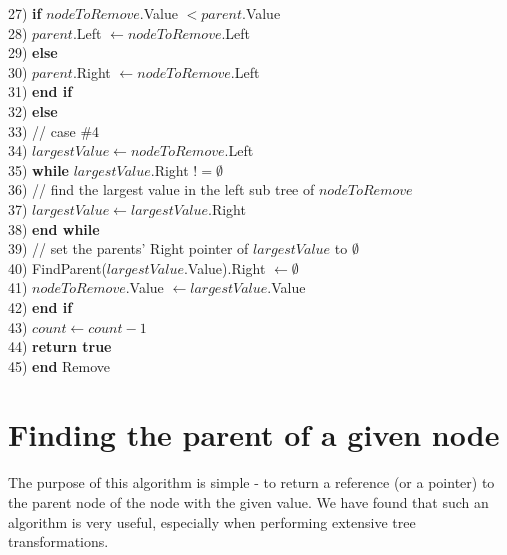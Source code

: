 \begin{tabbing}
27) \> \> \textbf{if} $nodeToRemove$.Value $< parent$.Value \\
28) \> \> \> $parent$.Left $\leftarrow nodeToRemove$.Left \\
29) \> \> \textbf{else} \\
30) \> \> \> $parent$.Right $\leftarrow nodeToRemove$.Left \\
31) \> \> \textbf{end if} \\
32) \> \textbf{else} \\
33) \> \> // case \#4 \\
34) \> \> $largestValue \leftarrow nodeToRemove$.Left \\
35) \> \> \textbf{while} $largestValue$.Right $!= \emptyset$ \\
36) \> \> \> // find the largest value in the left sub tree of $nodeToRemove$ \\
37) \> \> \> $largestValue \leftarrow largestValue$.Right \\
38) \> \> \textbf{end while} \\
39) \> \> // set the parents' Right pointer of $largestValue$ to $\emptyset$ \\
40) \> \> FindParent($largestValue$.Value).Right $\leftarrow \emptyset$ \\
41) \> \> $nodeToRemove$.Value $\leftarrow largestValue$.Value \\
42) \> \textbf{end if} \\
43) \> $count \leftarrow count - 1$ \\
44) \> \textbf{return true} \\
45) \textbf{end} Remove \\
\end{tabbing}

\section{Finding the parent of a given node} \label{finding_parent_node}
The purpose of this algorithm is simple - to return a reference (or a pointer) to the parent node of the node with the given value. We have found that such an algorithm is very useful, especially when performing extensive tree transformations.

